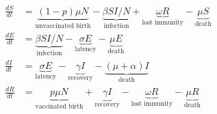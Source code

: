 \begin{align*}

\frac{dS}{dt} &= \underbrace{(1-p)\mu N}_\textrm{unvaccinated birth} - \underbrace{\beta S I / N}_\textrm{infection} + \underbrace{\omega R}_\textrm{lost immunity} - \underbrace{ \mu S}_\text{death} 

\\

\frac{dE}{dt} &=  \underbrace{\beta S I / N}_\textrm{infection} - \underbrace{\sigma E}_\textrm{latency} - \underbrace{\mu E}_\text{death}

\\

\frac{dI}{dt} &=  \underbrace{\sigma E}_\textrm{latency} - \underbrace{\gamma I}_\text{recovery} - \underbrace{(\mu + \alpha)I}_\text{death}

\\

\frac{dR}{dt} &= \underbrace{p \mu N}_\textrm{vaccinated birth} + \underbrace{\gamma I}_\textrm{recovery} - \underbrace{\omega R}_\textrm{lost immunity}  - \underbrace{\mu R}_\textrm{death}

\end{align*}

